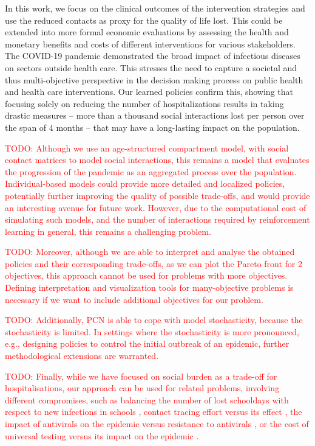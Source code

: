 \documentclass{article}
\renewcommand{\cite}[1]{\citep{#1}}
\newcommand\todo[1]{\textcolor{red}{TODO: #1}}
\begin{document}
In this work, we focus on the clinical outcomes of the intervention strategies and use the reduced contacts as proxy for the quality of life lost. This could be extended into more formal economic evaluations by assessing the health and monetary benefits and costs of different interventions for various stakeholders. The COVID-19 pandemic demonstrated the broad impact of infectious diseases on sectors outside health care. This stresses the need to capture a societal and thus multi-objective perspective in the decision making process on public health and health care interventions. Our learned policies confirm this, showing that focusing solely on reducing the number of hospitalizations results in taking drastic measures -- more than a thousand social interactions lost per person over the span of 4 months -- that may have a long-lasting impact on the population.

\todo{Although we use an age-structured compartment model, with social contact matrices to model social interactions, this remains a model that evaluates the progression of the pandemic as an aggregated process over the population. Individual-based models could provide more detailed and localized policies, potentially further improving the quality of possible trade-offs, and would provide an interesting avenue for future work. However, due to the computational cost of simulating such models, and the number of interactions required by reinforcement learning in general, this remains a challenging problem.}

\todo{Moreover, although we are able to interpret and analyse the obtained policies and their corresponding trade-offs, as we can plot the Pareto front for 2 objectives, this approach cannot be used for problems with more objectives. Defining interpretation and visualization tools for many-objective problems is necessary if we want to include additional objectives for our problem.}

\todo{Additionally, PCN is able to cope with model stochasticity, because the stochasticity is limited. In settings where the stochasticity is more pronounced, e.g., designing policies to control the initial outbreak of an epidemic, further methodological extensions are warranted.}

\todo{Finally, while we have focused on social burden as a trade-off for hospitalisations, our approach can be used for related problems, involving different compromises, such as balancing the number of lost schooldays with respect to new infections in schools \cite{torneri2021controlling}, contact tracing effort versus its effect \cite{willem2021impact}, the impact of antivirals on the epidemic versus resistance to antivirals \cite{torneri2020prospect}, or the cost of universal testing versus its impact on the epidemic \cite{libin2021assessing}.}
\end{document}
